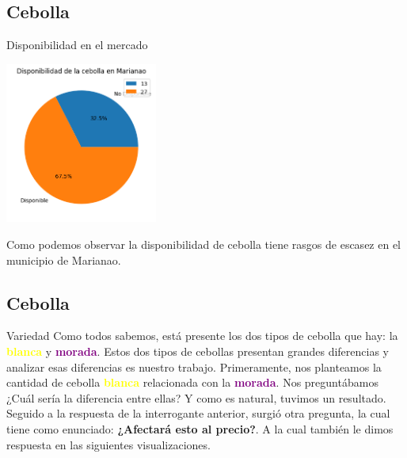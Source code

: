 \subsection{Cebolla}
\begin{frame}[fragile]{Disponibilidad en el mercado}
  \begin{center}
    \includegraphics[width=5cm]{disponibilidad.png}
  \end{center}
  Como podemos observar la disponibilidad de cebolla tiene rasgos de escasez en el municipio de Marianao.
\end{frame}

\subsection{Cebolla}
\begin{frame}[fragile]{Variedad}
  Como todos sabemos, está presente los dos tipos de cebolla que hay: la \textbf{\textcolor{yellow}{blanca}} y \textbf{\textcolor{purple}{morada}}. 
  Estos dos tipos de cebollas presentan grandes diferencias y analizar esas diferencias es nuestro trabajo. 
  Primeramente, nos planteamos la cantidad de cebolla \textbf{\textcolor{yellow}{blanca}} relacionada con la \textbf{\textcolor{purple}{morada}}. 
  Nos preguntábamos ¿Cuál sería la diferencia entre ellas? Y como es natural, tuvimos un resultado. 
  Seguido a la respuesta de la interrogante anterior, surgió otra pregunta, la cual tiene como enunciado: \textbf{¿Afectará esto al precio?}. 
  A la cual también le dimos respuesta en las siguientes visualizaciones.

\end{frame}

